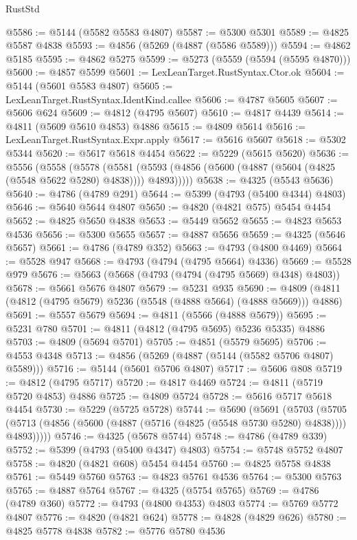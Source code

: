 \begin{lexlean}{RustStd}
\begin{coremodule}
@5586 := @5144 (@5582 @5583 @4807)
@5587 := @5300 @5301
@5589 := @4825 @5587 @4838
@5593 := @4856 (@5269 (@4887 (@5586 @5589)))
@5594 := @4862 @5185
@5595 := @4862 @5275
@5599 := @5273 (@5559 (@5594 (@5595 @4870)))
@5600 := @4857 @5599
@5601 := LexLeanTarget.RustSyntax.Ctor.ok
@5604 := @5144 (@5601 @5583 @4807)
@5605 := LexLeanTarget.RustSyntax.IdentKind.callee
@5606 := @4787 @5605
@5607 := @5606 @624
@5609 := @4812 (@4795 @5607)
@5610 := @4817 @4439
@5614 := @4811 (@5609 @5610 @4853) @4886
@5615 := @4809 @5614
@5616 := LexLeanTarget.RustSyntax.Expr.apply
@5617 := @5616 @5607
@5618 := @5302 @5344
@5620 := @5617 @5618 @4454
@5622 := @5229 (@5615 @5620)
@5636 := @5556
    (@5558
      (@5578
        (@5581 (@5593 (@4856 (@5600 (@4887 (@5604 (@4825 (@5548 @5622 @5280) @4838)))) @4893)))))
@5638 := @4325 (@5543 @5636)
@5640 := @4786 (@4789 @291)
@5644 := @5399 (@4793 (@5400 @4344) @4803)
@5646 := @5640 @5644 @4807
@5650 := @4820 (@4821 @575) @5454 @4454
@5652 := @4825 @5650 @4838
@5653 := @5449 @5652
@5655 := @4823 @5653 @4536
@5656 := @5300 @5655
@5657 := @4887 @5656
@5659 := @4325 (@5646 @5657)
@5661 := @4786 (@4789 @352)
@5663 := @4793 (@4800 @4469)
@5664 := @5528 @947
@5668 := @4793 (@4794 (@4795 @5664) @4336)
@5669 := @5528 @979
@5676 := @5663 (@5668 (@4793 (@4794 (@4795 @5669) @4348) @4803))
@5678 := @5661 @5676 @4807
@5679 := @5231 @935
@5690 := @4809 (@4811 (@4812 (@4795 @5679) @5236 (@5548 (@4888 @5664) (@4888 @5669))) @4886)
@5691 := @5557 @5679
@5694 := @4811 (@5566 (@4888 @5679))
@5695 := @5231 @780
@5701 := @4811 (@4812 (@4795 @5695) @5236 @5335) @4886
@5703 := @4809 (@5694 @5701)
@5705 := @4851 (@5579 @5695)
@5706 := @4553 @4348
@5713 := @4856 (@5269 (@4887 (@5144 (@5582 @5706 @4807) @5589)))
@5716 := @5144 (@5601 @5706 @4807)
@5717 := @5606 @808
@5719 := @4812 (@4795 @5717)
@5720 := @4817 @4469
@5724 := @4811 (@5719 @5720 @4853) @4886
@5725 := @4809 @5724
@5728 := @5616 @5717 @5618 @4454
@5730 := @5229 (@5725 @5728)
@5744 := @5690
    (@5691
      (@5703
        (@5705 (@5713 (@4856 (@5600 (@4887 (@5716 (@4825 (@5548 @5730 @5280) @4838)))) @4893)))))
@5746 := @4325 (@5678 @5744)
@5748 := @4786 (@4789 @339)
@5752 := @5399 (@4793 (@5400 @4347) @4803)
@5754 := @5748 @5752 @4807
@5758 := @4820 (@4821 @608) @5454 @4454
@5760 := @4825 @5758 @4838
@5761 := @5449 @5760
@5763 := @4823 @5761 @4536
@5764 := @5300 @5763
@5765 := @4887 @5764
@5767 := @4325 (@5754 @5765)
@5769 := @4786 (@4789 @360)
@5772 := @4793 (@4800 @4353) @4803
@5774 := @5769 @5772 @4807
@5776 := @4820 (@4821 @624)
@5778 := @4828 (@4829 @626)
@5780 := @4825 @5778 @4838
@5782 := @5776 @5780 @4536

\end{coremodule}
\end{lexlean}
